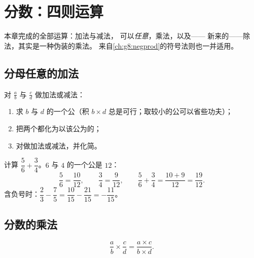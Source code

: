 \chapter{分数：四则运算}\label{ch:g8:fractions}

本章完成的全部运算：加法与减法，
可以\emph{任意}，乘法，以及——
新来的——除法，其实是一种伪装的乘法。
来自\cref{ch:g8:negprod}的符号法则也一并适用。

\section{分母任意的加法}

\begin{method}[通分]\label{met:g8:fractions:add}
对 $\frac ab$ 与 $\frac cd$ 做加法或减法：
\begin{enumerate}
  \item 求 $b$ 与 $d$ 的一个公（积
        $b \times d$ 总是可行；取较小的公可以省些功夫）；
  \item 把两个都化为以该公为的；
  \item 对做加法或减法，并化简。
\end{enumerate}
\end{method}

\begin{example}\label{ex:g8:fractions:add}
计算 $\dfrac{5}{6} + \dfrac{3}{4}$。$6$ 与
$4$ 的一个公是 $12$：
\[
\frac{5}{6} = \frac{10}{12},
\qquad
\frac{3}{4} = \frac{9}{12},
\qquad
\frac{5}{6} + \frac{3}{4} = \frac{10 + 9}{12} = \frac{19}{12}.
\]
含负号时：$\dfrac{2}{3} - \dfrac{7}{5} = \dfrac{10}{15} -
\dfrac{21}{15} = -\dfrac{11}{15}$。
\end{example}

\section{分数的乘法}

\begin{theorem}[分数的乘积]\label{thm:g8:fractions:mult}
\[
\frac{a}{b} \times \frac{c}{d} = \frac{a \times c}{b \times d} .
\]
\end{theorem}

